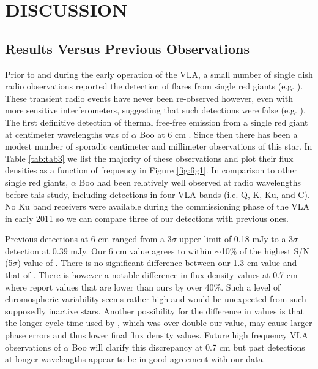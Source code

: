 \documentclass[iop]{emulateapj}
\begin{document}
\section{DISCUSSION}
\subsection{Results Versus Previous Observations} \label{disc1}
Prior to and during the early operation of the VLA, a small number of single dish radio observations reported the detection of flares from single red giants (e.g. \citealt{1981ApJ...245L..71B}). These transient radio events have never been re-observed however, even with more sensitive interferometers, suggesting that such detections were false (e.g. \citealt{1992MNRAS.254....1B}). The first definitive detection of thermal free-free emission from a single red giant at centimeter wavelengths was of $\alpha$ Boo at 6 cm \citep{1983ApJ...274L..77D,1986AJ.....91..602D}. Since then there has been a modest number of sporadic centimeter and millimeter observations of this star. In Table \ref{tab:tab3} we list the majority of these observations and plot their flux densities as a function of frequency in Figure \ref{fig:fig1}. In comparison to other single red giants, $\alpha$ Boo had been relatively well observed at radio wavelengths before this study, including detections in four VLA bands (i.e. Q, K, Ku, and C). No Ku band receivers were available during the commissioning phase of the VLA in early 2011 so we can compare three of our detections with previous ones. 

Previous detections at 6 cm ranged from a 3$\sigma$ upper limit of 0.18 mJy to a 3$\sigma$ detection at 0.39 mJy. Our 6 cm value agrees to within $\sim$10$\%$ of the highest S/N (5$\sigma$) value of \cite{1986AJ.....91..602D}. There is no significant difference between our 1.3 cm value and that of \cite{2011AA...533A.107D}.
There is however a notable difference in flux density values at 0.7 cm  where \cite{2011AA...533A.107D} report values that are lower than ours by over 40\%. Such a level of chromospheric variability seems rather high and would be unexpected from such supposedly inactive stars. Another possibility for the difference in values is that the longer cycle time used by \cite{2011AA...533A.107D}, which was over double our value, may cause larger phase errors and thus lower final flux density values. Future high frequency VLA observations of $\alpha$ Boo will clarify this discrepancy at 0.7 cm but past detections at longer wavelengths appear to be in good agreement with our data.
\end{document}

